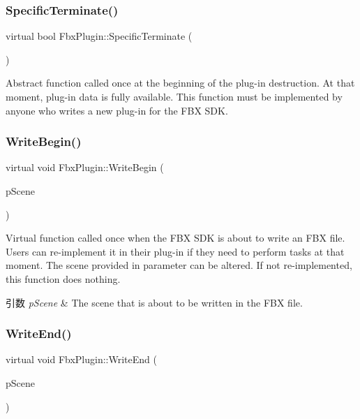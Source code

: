 \subsubsection{\texorpdfstring{Specific\+Terminate()}{SpecificTerminate()}}
{\footnotesize\ttfamily virtual bool Fbx\+Plugin\+::\+Specific\+Terminate (\begin{DoxyParamCaption}{ }\end{DoxyParamCaption})\hspace{0.3cm}{\ttfamily [pure virtual]}}

Abstract function called once at the beginning of the plug-\/in destruction. At that moment, plug-\/in data is fully available. This function must be implemented by anyone who writes a new plug-\/in for the F\+BX S\+DK. \mbox{\label{class_fbx_plugin_aff87a8ef5c8b6bae66cc10970b7827bf}} 
\subsubsection{\texorpdfstring{Write\+Begin()}{WriteBegin()}}
{\footnotesize\ttfamily virtual void Fbx\+Plugin\+::\+Write\+Begin (\begin{DoxyParamCaption}\item[{\hyperlink{class_fbx_scene}{Fbx\+Scene} \&}]{p\+Scene }\end{DoxyParamCaption})\hspace{0.3cm}{\ttfamily [virtual]}}

Virtual function called once when the F\+BX S\+DK is about to write an F\+BX file. Users can re-\/implement it in their plug-\/in if they need to perform tasks at that moment. The scene provided in parameter can be altered. If not re-\/implemented, this function does nothing. 
\begin{DoxyParams}{引数}
{\em p\+Scene} & The scene that is about to be written in the F\+BX file. \\
\hline
\end{DoxyParams}
\mbox{\label{class_fbx_plugin_a7c61fbd0c3d3a3d41f7208c2b28ce379}} 
\subsubsection{\texorpdfstring{Write\+End()}{WriteEnd()}}
{\footnotesize\ttfamily virtual void Fbx\+Plugin\+::\+Write\+End (\begin{DoxyParamCaption}\item[{\hyperlink{class_fbx_scene}{Fbx\+Scene} \&}]{p\+Scene }\end{DoxyParamCaption})\hspace{0.3cm}{\ttfamily [virtual]}}

